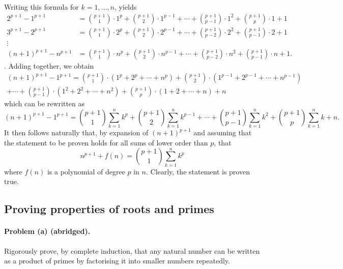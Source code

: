 \documentclass{article}
\begin{document}
Writing this formula for $k = 1, \ldots, n$, yields \begin{align*}
  2^{p+1} - 1^{p+1} &= \binom{p+1}{1} \cdot 1^p + \binom{p+1}{2} \cdot 1^{p-1} + \cdots + \binom{p+1}{p-1} \cdot 1^2 + \binom{p+1}{p} \cdot 1 + 1 \\
  3^{p+1} - 2^{p+1} &= \binom{p+1}{1} \cdot 2^p + \binom{p+1}{2} \cdot 2^{p-1} + \cdots + \binom{p+1}{p-2} \cdot 2^2 + \binom{p+1}{p-1} \cdot 2 + 1 \\
  \vdots & \\
  (n + 1)^{p+1} - n^{p+1} &= \binom{p+1}{1} \cdot n^p + \binom{p+1}{2} \cdot n^{p-1} + \cdots + \binom{p+1}{p-2} \cdot n^2 + \binom{p+1}{p-1} \cdot n + 1.
\end{align*}. Adding together, we obtain \begin{multline*}
  (n + 1)^{p+1} - 1^{p+1} = \binom{p+1}{1} \cdot (1^p + 2^p + \cdots + n^p) + \binom{p+1}{2} \cdot (1^{p-1} + 2^{p-1} + \cdots + n^{p-1}) \\ + \cdots + \binom{p+1}{p-1} \cdot (1^2 + 2^2 + \cdots + n^2) + \binom{p+1}{p} \cdot (1 + 2 + \cdots + n) + n
\end{multline*} which can be rewritten as \begin{equation*}
  (n + 1)^{p+1} - 1^{p+1} = \binom{p+1}{1} \sum^n_{k=1} k^p + \binom{p+1}{2} \sum^n_{k=1} k^{p-1} + \cdots + \binom{p+1}{p-1} \sum^n_{k=1} k^2 + \binom{p+1}{p} \sum^n_{k=1} k + n.
\end{equation*} It then follows naturally that, by expansion of $(n + 1)^{p+1}$ and assuming that the statement to be proven holds for all sums of lower order than $p$, that \begin{equation*}
  n^{p+1} + f(n) = \binom{p+1}{1} \sum^n_{k=1} k^p
\end{equation*} where $f(n)$ is a polynomial of degree $p$ in $n$. Clearly, the statement is proven true.

\setcounter{subsection}{16}
\subsection{Proving properties of roots and primes}

\paragraph{Problem (a) (abridged).} Rigorously prove, by complete induction, that any natural number can be written as a product of primes by factorising it into smaller numbers repeatedly.
\end{document}
